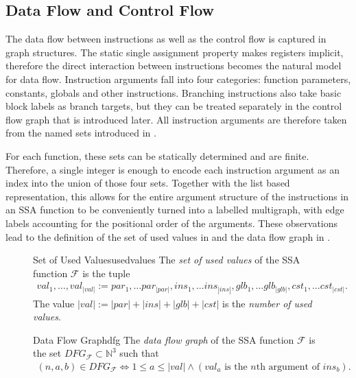 \subsection{Data Flow and Control Flow}

    The data flow between instructions as well as the control flow is captured
    in graph structures.
    The static single assignment property makes registers implicit, therefore
    the direct interaction between instructions becomes the natural model for
    data flow.
    Instruction arguments fall into four categories: function parameters,
    constants, globals and other instructions.
    Branching instructions also take basic block labels as branch targets,
    but they can be treated separately in the control flow graph that is
    introduced later.
    All instruction arguments are therefore taken from the named sets introduced
    in .

    For each function, these sets can be statically determined and are finite.
    Therefore, a single integer is enough to encode each instruction argument as
    an index into the union of those four sets.
    Together with the list based representation, this allows for the
    entire argument structure of the instructions in an SSA function to be
    conveniently turned into a labelled multigraph, with edge labels accounting
    for the positional order of the arguments.
    These observations lead to the definition of the set of used values in
     and the data flow graph in .

\begin{figure}[h]
\begin{definition}{Set of Used Values}{usedvalues}
    The {\em set of used values} of the SSA function $\mathcal F$ is the tuple
    \begin{align*}
       val_1,\dots,val_{|val|} := par_1,\dots par_{|par|},
                                  ins_1,\dots ins_{|ins|},
                                  glb_1,\dots glb_{|glb|},
                                  cst_1,\dots cst_{|cst|}.
    \end{align*}
    The value $|val|:=|par|+|ins|+|glb|+|cst|$ is the
    {\em number of used values}.
\end{definition}

\begin{definition}{Data Flow Graph}{dfg}
    The {\em data flow graph} of the SSA function $\mathcal F$ is the set
    $DFG_{\mathcal F}\subset \mathbb N^3$ such that
    \begin{align*}
        (n,a,b)\in DFG_{\mathcal F}\iff 1\leq a\leq |val|
            \mathrel{\land}(val_a\text{ is the $n$th argument of }ins_b).
    \end{align*}
\end{definition}
\end{figure}

